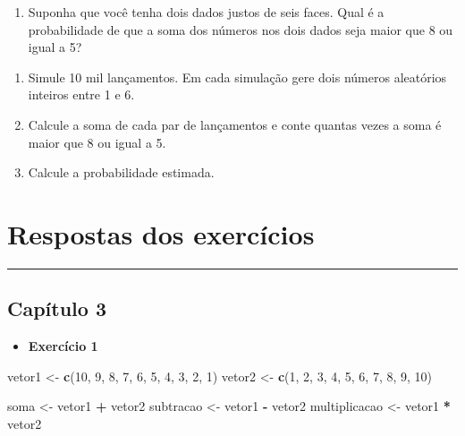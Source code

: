 \documentclass[
]{book}
\newenvironment{Shaded}{\begin{snugshade}}{\end{snugshade}}
\newcommand{\DecValTok}[1]{\textcolor[rgb]{0.00,0.00,0.81}{#1}}
\newcommand{\FunctionTok}[1]{\textcolor[rgb]{0.13,0.29,0.53}{\textbf{#1}}}
\newcommand{\NormalTok}[1]{#1}
\newcommand{\OtherTok}[1]{\textcolor[rgb]{0.56,0.35,0.01}{#1}}
\newcommand{\SpecialCharTok}[1]{\textcolor[rgb]{0.81,0.36,0.00}{\textbf{#1}}}
\providecommand{\tightlist}{%
  \setlength{\itemsep}{0pt}\setlength{\parskip}{0pt}}
\begin{document}
\begin{enumerate}
\def\labelenumi{\arabic{enumi}.}
\setcounter{enumi}{2}
\tightlist
\item
  Suponha que você tenha dois dados justos de seis faces. Qual é a probabilidade de que a soma dos números nos dois dados seja maior que 8 ou igual a 5?
\end{enumerate}

\begin{enumerate}
\def\labelenumi{(\alph{enumi})}
\tightlist
\item
  Simule 10 mil lançamentos. Em cada simulação gere dois números aleatórios inteiros entre 1 e 6.
\item
  Calcule a soma de cada par de lançamentos e conte quantas vezes a soma é maior que 8 ou igual a 5.
\item
  Calcule a probabilidade estimada.
\end{enumerate}

\chapter{Respostas dos exercícios}\label{respostas-dos-exercuxedcios}

\begin{center}\rule{0.5\linewidth}{0.5pt}\end{center}

\section{Capítulo 3}\label{capuxedtulo-3}

\begin{itemize}
\tightlist
\item
  \textbf{Exercício 1}
\end{itemize}

\begin{Shaded}
\begin{Highlighting}[]
\NormalTok{vetor1 }\OtherTok{\textless{}{-}} \FunctionTok{c}\NormalTok{(}\DecValTok{10}\NormalTok{, }\DecValTok{9}\NormalTok{, }\DecValTok{8}\NormalTok{, }\DecValTok{7}\NormalTok{, }\DecValTok{6}\NormalTok{, }\DecValTok{5}\NormalTok{, }\DecValTok{4}\NormalTok{, }\DecValTok{3}\NormalTok{, }\DecValTok{2}\NormalTok{, }\DecValTok{1}\NormalTok{)}
\NormalTok{vetor2 }\OtherTok{\textless{}{-}} \FunctionTok{c}\NormalTok{(}\DecValTok{1}\NormalTok{, }\DecValTok{2}\NormalTok{, }\DecValTok{3}\NormalTok{, }\DecValTok{4}\NormalTok{, }\DecValTok{5}\NormalTok{, }\DecValTok{6}\NormalTok{, }\DecValTok{7}\NormalTok{, }\DecValTok{8}\NormalTok{, }\DecValTok{9}\NormalTok{, }\DecValTok{10}\NormalTok{)}

\NormalTok{soma }\OtherTok{\textless{}{-}}\NormalTok{ vetor1 }\SpecialCharTok{+}\NormalTok{ vetor2}
\NormalTok{subtracao }\OtherTok{\textless{}{-}}\NormalTok{ vetor1 }\SpecialCharTok{{-}}\NormalTok{ vetor2}
\NormalTok{multiplicacao }\OtherTok{\textless{}{-}}\NormalTok{ vetor1 }\SpecialCharTok{*}\NormalTok{ vetor2}
\end{Highlighting}
\end{Shaded}
\end{document}
